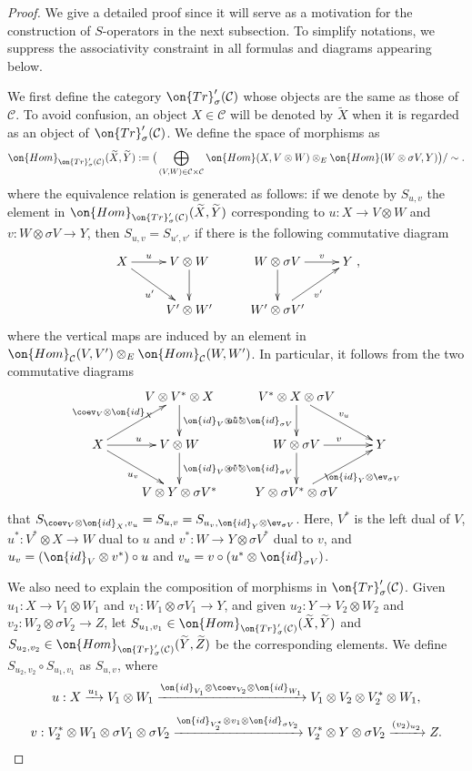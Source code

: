 \documentclass[11pt]{amsart}
\theoremstyle{definition}
\theoremstyle{definition}
\theoremstyle{definition}
\numberwithin{equation}{subsection}
\newcommand{\mC}{{\mathcal C}}
\newcommand{\Hom}{{\on{Hom}}}
\newcommand{\id}{{\on{id}}}
\newcommand{\Tr}{{\on{Tr}}}
\begin{document}
\begin{proof}
We give a detailed proof since it will serve as a motivation for the construction of $S$-operators in the next subsection. To simplify notations, we suppress the associativity constraint in all formulas and diagrams appearing below.

We first define the category $\Tr'_\sigma(\mC)$  whose objects are the same as those of $\mC$. To avoid confusion, an object $X\in\mC$ will be denoted by $\widetilde{X}$ when it is regarded as an object of $\Tr'_\sigma(\mC)$. We define the space of morphisms as 
\begin{equation*}
\label{E:trace hom}
\Hom_{\Tr'_\sigma(\mC)}(\widetilde{X},\widetilde{Y}):=\big(\bigoplus_{(V,W)\in \mC\times \mC}\Hom(X, V\otimes W)\otimes_E \Hom(W\otimes \sigma V, Y)\big)/\sim.
\end{equation*}
where the equivalence relation is generated as follows: if we denote by $S_{u,v}$ the element in $\Hom_{\Tr'_\sigma(\mC)}(\widetilde{X},\widetilde{Y})$ corresponding to $u: X\to V\otimes W$ and $v:W\otimes \sigma V\to Y$, then $S_{u,v}=S_{u',v'}$ if there is the following commutative diagram
\[\xymatrix{
X\ar^-{u}[r] \ar_{u'}[dr]& V\otimes W\ar[d] & W\otimes \sigma V\ar[d]\ar^-{v}[r] & Y\\
& V'\otimes W' & W'\otimes \sigma V'\ar_{v'}[ur] &
},\]
where the vertical maps are induced by an element in $\Hom_\mC(V,V')\otimes_E\Hom_{\mC}(W,W')$. In particular, it follows from the two commutative diagrams 
\begin{equation}
\label{E:frac}
\xymatrix{
&V\otimes V^*\otimes X\ar^{\id_V\otimes u^*}[d]& V^*\otimes X\otimes \sigma V\ar^{v_u}[dr]\ar_{u^*\otimes \id_{\sigma V}}[d]&\\
X\ar^{\coev_V\otimes\id_X}[ur]\ar^{u}[r]\ar_{u_v}[dr]&V\otimes W\ar^{\id_V\otimes v^*}[d]&W\otimes \sigma V\ar^{v}[r]\ar_{v^*\otimes\id_{\sigma V}}[d]& Y\\
&V\otimes Y\otimes \sigma V^*& Y\otimes \sigma V^*\otimes \sigma V\ar_{\id_Y\otimes\ev_{\sigma V}}[ur]&
}
\end{equation}
that $S_{\coev_V\otimes\id_X, v_u}=S_{u,v}=S_{u_v,\id_Y\otimes\ev_{\sigma V}}$.  
Here, $V^*$ is the left dual of $V$, $u^*: V^*\otimes X\to W$ dual to $u$ and $v^*:W\to Y\otimes \sigma V^*$ dual to $v$, and
$u_v= (\id_V\otimes v^*)\circ u$ and $v_u= v\circ(u^*\otimes \id_{\sigma V})$. 


We also need to explain the composition of morphisms in $\Tr'_\sigma(\mC)$. Given $u_1: X\to V_1\otimes W_1$ and $v_1: W_1\otimes \sigma V_1\to Y$, and given $u_2: Y\to V_2\otimes W_2$ and $v_2: W_2\otimes \sigma V_2\to Z$, let $S_{u_1,v_1}\in \Hom_{\Tr'_\sigma(\mC)}(\widetilde{X},\widetilde{Y})$ and $S_{u_2,v_2}\in \Hom_{\Tr'_\sigma(\mC)}(\widetilde{Y},\widetilde{Z})$ be the corresponding elements. We define $S_{u_2,v_2}\circ S_{u_1,v_1}$ as $S_{u,v}$, where 
\[u: X\xrightarrow{u_1} V_1\otimes W_1\xrightarrow{\id_{V_1}\otimes\coev_{V_2}\otimes\id_{W_1}}V_1\otimes V_2\otimes V^*_2\otimes W_1,\] 
\[v: V^*_2\otimes W_1\otimes \sigma V_1\otimes \sigma V_2\xrightarrow{\id_{V^*_2}\otimes v_1\otimes\id_{\sigma V_2}}V^*_2\otimes Y\otimes \sigma V_2\xrightarrow{(v_2)_{u_2}} Z.\]



\end{proof}
\end{document}
